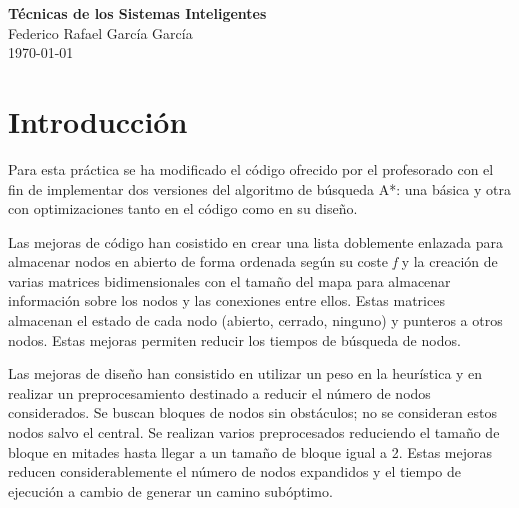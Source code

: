 \documentclass[11pt,spanish]{article} %
\begin{document}
\begin{titlepage}
\Large \textbf{Técnicas de los Sistemas Inteligentes}\\[1.0cm] %

\large Federico Rafael García García\\[2.5cm] %

{\today}\\[3cm] %


\vfill %

\end{titlepage}


\thispagestyle{empty}
\setcounter{page}{0}
\tableofcontents
\clearpage


\section{Introducción}

Para esta práctica se ha modificado el código ofrecido por el profesorado con el fin de implementar dos versiones del algoritmo de búsqueda A*: una básica y otra con optimizaciones tanto en el código como en su diseño.

Las mejoras de código han cosistido en crear una lista doblemente enlazada para almacenar nodos en abierto de forma ordenada según su coste \textit{f} y la creación de varias matrices bidimensionales con el tamaño del mapa para almacenar información sobre los nodos y las conexiones entre ellos. Estas matrices almacenan el estado de cada nodo (abierto, cerrado, ninguno) y punteros a otros nodos. Estas mejoras permiten reducir los tiempos de búsqueda de nodos.

Las mejoras de diseño han consistido en utilizar un peso en la heurística y en realizar un preprocesamiento destinado a reducir el número de nodos considerados. Se buscan bloques de nodos sin obstáculos; no se consideran estos nodos salvo el central. Se realizan varios preprocesados reduciendo el tamaño de bloque en mitades hasta llegar a un tamaño de bloque igual a 2. Estas mejoras reducen considerablemente el número de nodos expandidos y el tiempo de ejecución a cambio de generar un camino subóptimo.
\end{document}
